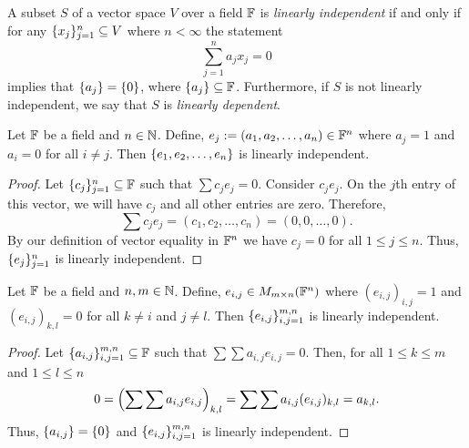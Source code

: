\begin{definition}
	A subset $S$ of a vector space $V$ over a field $\mathbb{F}$ is \textit{linearly independent} if and only if for any $\lbrace x_j \rbrace_{j=1}^n\subseteq V$ where $n<\infty$ the statement
	\[
		\sum_{j=1}^n a_jx_j=0
	\]
	implies that $\lbrace a_j \rbrace=\lbrace 0 \rbrace$, where $\lbrace a_j \rbrace\subseteq\mathbb{F}$.
	Furthermore, if $S$ is not linearly independent, we say that $S$ is \textit{linearly dependent}.
\end{definition}

\begin{example}
	Let $\mathbb{F}$ be a field and $n\in\mathbb{N}$.
	Define, $e_j:=(a_1,a_2,\ldots,a_n)\in\mathbb{F}^n$ where $a_j=1$ and $a_i=0$ for all $i\neq j$.
	Then $\lbrace e_1,e_2,\ldots,e_n \rbrace$ is linearly independent.
\end{example}
\begin{proof}
	Let $\lbrace c_j \rbrace_{j=1}^n\subseteq\mathbb{F}$ such that $\sum c_je_j=0$.
	Consider $c_je_j$.
	On the $j$th entry of this vector, we will have $c_j$ and all other entries are zero.
	Therefore,
	\[
		\sum c_je_j=(c_1,c_2,\ldots,c_n)=(0,0,\ldots,0).
	\]
	By our definition of vector equality in $\mathbb{F}^n$ we have $c_j=0$ for all $1\leq j\leq n$.
	Thus, $\lbrace e_j \rbrace_{j=1}^n$ is linearly independent.
\end{proof}

\begin{example}
	Let $\mathbb{F}$ be a field and $n,m\in\mathbb{N}$.
	Define, $e_{i,j}\in M_{m\times n}(\mathbb{F}^n)$ where $(e_{i,j})_{i,j}=1$ and $(e_{i,j})_{k,l}=0$ for all $k\neq i$ and $j\neq l$.
	Then $\lbrace e_{i,j} \rbrace_{i,j=1}^{m,n}$ is linearly independent.
\end{example}

\begin{proof}
	Let $\lbrace a_{i,j} \rbrace_{i,j=1}^{m,n}\subseteq\mathbb{F}$ such that $\sum\sum a_{i,j}e_{i,j}=0$.
	Then, for all $1\leq k\leq m$ and $1\leq l\leq n$
	\[
		0=\left( \sum\sum a_{i,j}e_{i,j} \right)_{k,l}=\sum\sum a_{i,j}(e_{i,j})_{k,l}=a_{k,l}.
	\]
	Thus, $\lbrace a_{i,j} \rbrace=\lbrace 0 \rbrace$ and $\lbrace e_{i,j} \rbrace_{i,j=1}^{m,n}$ is linearly independent.
\end{proof}

